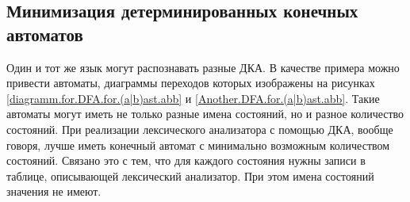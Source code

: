 \documentclass[10pt]{report}
\begin{document}
        \subsection{Минимизация детерминированных конечных автоматов}
Один и тот же язык могут распознавать разные ДКА. В качестве примера можно привести автоматы, диаграммы переходов которых изображены на рисунках
\ref{diagramm.for.DFA.for.(a|b)ast.abb} и \ref{Another.DFA.for.(a|b)ast.abb}. Такие автоматы могут иметь не только разные имена состояний, но и разное количество состояний.
При реализации лексического анализатора с помощью ДКА, вообще говоря, лучше иметь конечный автомат с минимально возможным количеством состояний. Связано это с тем, что для
каждого состояния нужны записи в таблице, описывающей лексический анализатор. При этом имена состояний значения не имеют.
\end{document}
